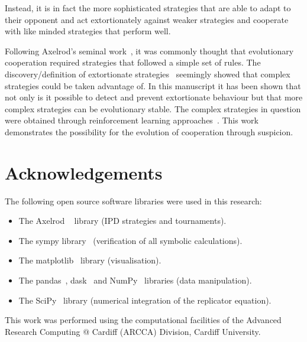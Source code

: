 \documentclass[a4paper]{article}
\begin{document}
Instead, it is in fact the more sophisticated strategies that are able to adapt
to their opponent and act extortionately against weaker strategies and
cooperate with like minded strategies that perform well.

Following Axelrod's seminal work~\cite{Axelrod1980, Axelrod1980a}, it was
commonly thought that evolutionary cooperation required strategies that followed
a simple set of rules. The discovery/definition of extortionate
strategies~\cite{Press2012} seemingly showed that complex strategies could be
taken advantage of. In this manuscript it has been shown that not only is it
possible to detect and prevent extortionate behaviour but that more complex
strategies can be evolutionary stable. The complex strategies in question were
obtained through reinforcement learning approaches~\cite{Harper2017, Moran1707}.
This work demonstrates the possibility for the evolution of cooperation
through suspicion.

\section*{Acknowledgements}

The following open source software libraries were used in this research:

\begin{itemize}
    \item The Axelrod ~\cite{Knight2016, Knight2018} library (IPD strategies and
        tournaments).
    \item The sympy library~\cite{Meurer2017} (verification of all symbolic
        calculations).
    \item The matplotlib~\cite{Droettboom2018} library (visualisation).
    \item The pandas~\cite{Structures2010}, dask~\cite{Dask2016} and
        NumPy~\cite{Oliphant2015} libraries (data manipulation).
    \item The SciPy~\cite{Jones2001} library (numerical integration of the
        replicator equation).
\end{itemize}

This work was performed using the computational facilities of the Advanced
Research Computing @ Cardiff (ARCCA) Division, Cardiff University.

\printbibliography



\end{document}
